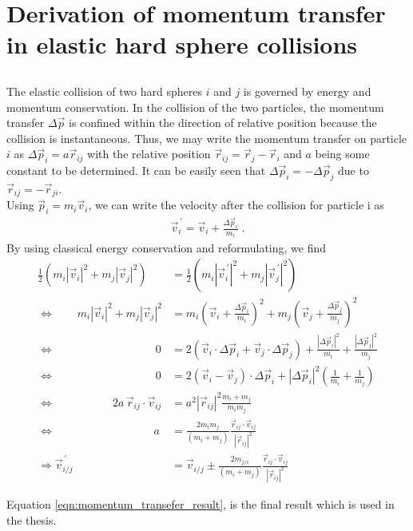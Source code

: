 

\chapter{Derivation of momentum transfer in elastic hard sphere collisions}
\section*{}
\label{sec:appendix}
The elastic collision of two hard spheres $i$ and $j$ is governed by energy and momentum conservation.
In the collision of the two particles, the momentum transfer $\Delta \vec{p}$ is confined within the direction of relative position because the collision is instantaneous. Thus, we may write the momentum transfer on particle $i$ as $\Delta \vec{p}_i = a \vec{r}_{ij}$ with the relative position $\vec{r}_{ij} = \vec{r}_{j} -\vec{r}_{i} $ and $a$ being some constant to be determined. It can be easily seen that $\Delta \vec{p}_i = - \Delta \vec{p}_j$ due to $\vec{r}_{ij} = -\vec{r}_{ji}$. \\

Using $\vec{p}_i = m_i \vec{v}_i$, we can write the velocity after the collision for particle i as
\begin{align}
\vec{v}_i^{\,'} = \vec{v}_i +\frac{\Delta \vec{p}_i } {m_i} \; \text{.}
\end{align}
By using classical energy conservation and reformulating, we find
\begin{align}
\label{eqn:momentum_transfer}
\frac{1}{2}\left( m_i |\vec{v}_i|^2 + m_j |\vec{v}_j|^2 \right) &= \frac{1}{2}\left( m_i |\vec{v}_i^{\,'}|^2 + m_j |\vec{v}_j^{\,'}|^2 \right) \\
\Leftrightarrow \qquad  m_i |\vec{v}_i|^2 + m_j |\vec{v}_j|^2  &= m_i \left(  \vec{v}_i +\frac{\Delta \vec{p}_i } {m_i} \right)^2 + m_ j\left(  \vec{v}_j +\frac{\Delta \vec{p}_j } {m_j} \right)^2 \\
\Leftrightarrow \qquad\qquad\qquad\qquad\quad\! 0 &= 2 \left(  \vec{v}_i \cdot  \Delta \vec{p}_i  +\vec{v}_j \cdot  \Delta \vec{p}_j   \right)+\frac{|\Delta \vec{p}_i|^2 } {m_i} +\frac{|\Delta \vec{p}_j|^2 } {m_j}\\
\Leftrightarrow  \qquad\qquad\qquad\qquad\quad\! 0 &= 2 (\vec{v}_i - \vec{v}_j)\cdot \Delta \vec{p}_i + |\Delta \vec{p}_i|^2 \left(\frac{1}{m_i} +\frac{1}{m_j} \right)\\
 \Leftrightarrow \qquad\qquad\quad\, 2 a \, \vec{r}_{ij} \cdot \vec{v}_{ij} &= a^2 |\vec{r}_{ij}|^2 \frac{m_i + m_j}{m_i m_j}\\
 \Leftrightarrow\qquad\qquad\qquad\qquad\;\;\; a &= \frac{2 m_i m_j }{(m_i + m_j)  } \frac{\vec{r}_{ij} \cdot \vec{v}_{ij}}{|\vec{r}_{ij}|^2}\\
\label{eqn:momentum_transefer_result}
\Rightarrow \vec{v}_{i/j}^{\,'} &= \vec{v}_{i/j} \pm \frac{2 m_{j/i} }{(m_i + m_j)  } \frac{\vec{r}_{ij} \cdot \vec{v}_{ij}}{|\vec{r}_{ij}|^2}
\end{align}

Equation \ref{eqn:momentum_transefer_result}, is the final result which is used in the thesis.
